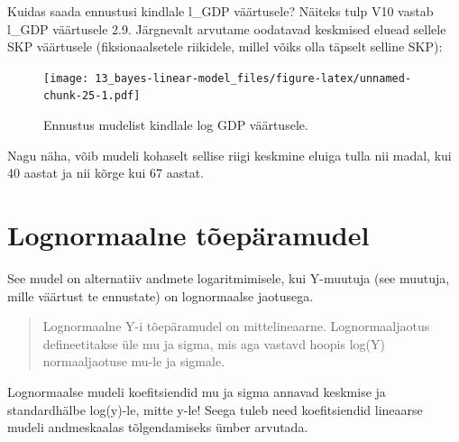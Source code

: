\documentclass[]{book}
\newenvironment{Shaded}{\begin{snugshade}}{\end{snugshade}}
\newcommand{\KeywordTok}[1]{\textcolor[rgb]{0.13,0.29,0.53}{\textbf{#1}}}
\newcommand{\DataTypeTok}[1]{\textcolor[rgb]{0.13,0.29,0.53}{#1}}
\newcommand{\FloatTok}[1]{\textcolor[rgb]{0.00,0.00,0.81}{#1}}
\newcommand{\CommentTok}[1]{\textcolor[rgb]{0.56,0.35,0.01}{\textit{#1}}}
\newcommand{\OperatorTok}[1]{\textcolor[rgb]{0.81,0.36,0.00}{\textbf{#1}}}
\newcommand{\NormalTok}[1]{#1}
\begin{document}
Kuidas saada ennustusi kindlale l\_GDP väärtusele? Näiteks tulp V10
vastab l\_GDP väärtusele 2.9. Järgnevalt arvutame oodatavad keskmised
eluead sellele SKP väärtusele (fiksionaalsetele riikidele, millel võiks
olla täpselt selline SKP):

\begin{Shaded}
\end{Shaded}

\begin{figure}
\centering
\texttt{[image: 13\_bayes-linear-model\_files/figure-latex/unnamed-chunk-25-1.pdf]}
\caption{\label{fig:unnamed-chunk-25}Ennustus mudelist kindlale log GDP
väärtusele.}
\end{figure}

\begin{Shaded}
\end{Shaded}

Nagu näha, võib mudeli kohaselt sellise riigi keskmine eluiga tulla nii
madal, kui 40 aastat ja nii kõrge kui 67 aastat.

\section*{Lognormaalne tõepäramudel}\label{lognormaalne-toeparamudel}

See mudel on alternatiiv andmete logaritmimisele, kui Y-muutuja (see
muutuja, mille väärtust te ennustate) on lognormaalse jaotusega.

\begin{quote}
Lognormaalne Y-i tõepäramudel on mittelineaarne. Lognormaaljaotus
defineetitakse üle mu ja sigma, mis aga vastavd hoopis log(Y)
normaaljaotuse mu-le ja sigmale.
\end{quote}

Lognormaalse mudeli koefitsiendid mu ja sigma annavad keskmise ja
standardhälbe log(y)-le, mitte y-le! Seega tuleb need koefitsiendid
lineaarse mudeli andmeskaalas tõlgendamiseks ümber arvutada.
\end{document}
